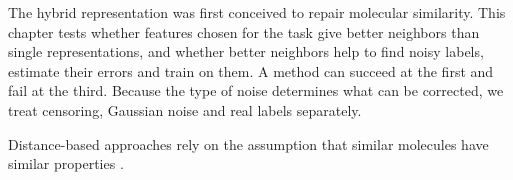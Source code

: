 The hybrid representation was first conceived to repair molecular similarity. This chapter tests whether features chosen for the task give better neighbors than single representations, and whether better neighbors help to find noisy labels, estimate their errors and train on them. A method can succeed at the first and fail at the third. Because the type of noise determines what can be corrected, we treat censoring, Gaussian noise and real labels separately.

Distance-based approaches rely on the assumption that similar molecules have similar properties \citep{Cherkasov2014}.
